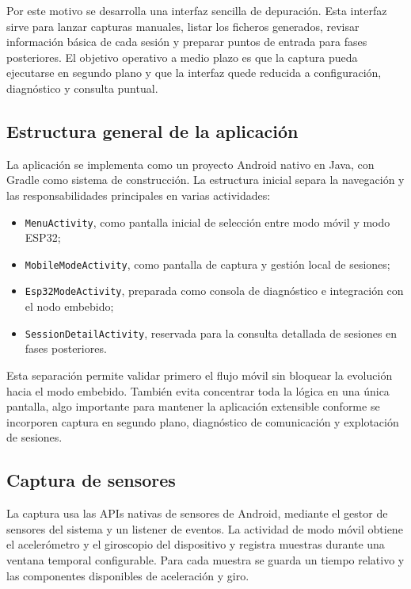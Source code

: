Por este motivo se desarrolla una interfaz sencilla de depuración. Esta interfaz sirve para lanzar capturas manuales, listar los ficheros generados, revisar información básica de cada sesión y preparar puntos de entrada para fases posteriores. El objetivo operativo a medio plazo es que la captura pueda ejecutarse en segundo plano y que la interfaz quede reducida a configuración, diagnóstico y consulta puntual.

\subsection{Estructura general de la aplicación}

La aplicación se implementa como un proyecto Android nativo en Java, con Gradle como sistema de construcción. La estructura inicial separa la navegación y las responsabilidades principales en varias actividades:

\begin{itemize}
  \item \texttt{MenuActivity}, como pantalla inicial de selección entre modo móvil y modo ESP32;
  \item \texttt{MobileModeActivity}, como pantalla de captura y gestión local de sesiones;
  \item \texttt{Esp32ModeActivity}, preparada como consola de diagnóstico e integración con el nodo embebido;
  \item \texttt{SessionDetailActivity}, reservada para la consulta detallada de sesiones en fases posteriores.
\end{itemize}

Esta separación permite validar primero el flujo móvil sin bloquear la evolución hacia el modo embebido. También evita concentrar toda la lógica en una única pantalla, algo importante para mantener la aplicación extensible conforme se incorporen captura en segundo plano, diagnóstico de comunicación y explotación de sesiones.

\subsection{Captura de sensores}

La captura usa las APIs nativas de sensores de Android, mediante el gestor de sensores del sistema y un listener de eventos. La actividad de modo móvil obtiene el acelerómetro y el giroscopio del dispositivo y registra muestras durante una ventana temporal configurable. Para cada muestra se guarda un tiempo relativo y las componentes disponibles de aceleración y giro.

